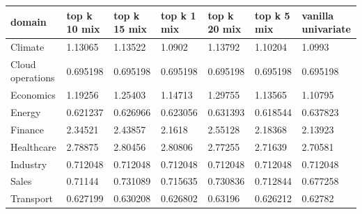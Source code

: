 \begin{tabular}{lllllll}
\toprule
domain & top k 10 mix & top k 15 mix & top k 1 mix & top k 20 mix & top k 5 mix & vanilla univariate \\
\midrule
Climate & 1.13065 & 1.13522 & 1.0902 & 1.13792 & 1.10204 & 1.0993 \\
Cloud operations & 0.695198 & 0.695198 & 0.695198 & 0.695198 & 0.695198 & 0.695198 \\
Economics & 1.19256 & 1.25403 & 1.14713 & 1.29755 & 1.13565 & 1.10795 \\
Energy & 0.621237 & 0.626966 & 0.623056 & 0.631393 & 0.618544 & 0.637823 \\
Finance & 2.34521 & 2.43857 & 2.1618 & 2.55128 & 2.18368 & 2.13923 \\
Healthcare & 2.78875 & 2.80456 & 2.80806 & 2.77255 & 2.71639 & 2.70581 \\
Industry & 0.712048 & 0.712048 & 0.712048 & 0.712048 & 0.712048 & 0.712048 \\
Sales & 0.71144 & 0.731089 & 0.715635 & 0.730836 & 0.712844 & 0.677258 \\
Transport & 0.627199 & 0.630208 & 0.626802 & 0.63196 & 0.626212 & 0.62782 \\
\bottomrule
\end{tabular}
